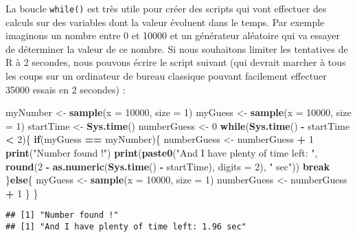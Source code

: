 \documentclass[]{book}
\newenvironment{Shaded}{\begin{snugshade}}{\end{snugshade}}
\newcommand{\KeywordTok}[1]{\textcolor[rgb]{0.13,0.29,0.53}{\textbf{#1}}}
\newcommand{\DataTypeTok}[1]{\textcolor[rgb]{0.13,0.29,0.53}{#1}}
\newcommand{\DecValTok}[1]{\textcolor[rgb]{0.00,0.00,0.81}{#1}}
\newcommand{\StringTok}[1]{\textcolor[rgb]{0.31,0.60,0.02}{#1}}
\newcommand{\ControlFlowTok}[1]{\textcolor[rgb]{0.13,0.29,0.53}{\textbf{#1}}}
\newcommand{\OperatorTok}[1]{\textcolor[rgb]{0.81,0.36,0.00}{\textbf{#1}}}
\newcommand{\NormalTok}[1]{#1}
\theoremstyle{definition}
\theoremstyle{definition}
\theoremstyle{definition}
\theoremstyle{remark}
\begin{document}
La boucle \texttt{while()} est très utile pour créer des scripts qui
vont effectuer des calculs sur des variables dont la valeur évoluent
dans le temps. Par exemple imaginons un nombre entre 0 et 10000 et un
générateur aléatoire qui va essayer de déterminer la valeur de ce
nombre. Si nous souhaitons limiter les tentatives de R à 2 secondes,
nous pouvons écrire le script suivant (qui devrait marcher à tous les
coups sur un ordinateur de bureau classique pouvant facilement effectuer
35000 essais en 2 secondes) :

\begin{Shaded}
\begin{Highlighting}[]
\NormalTok{myNumber <-}\StringTok{ }\KeywordTok{sample}\NormalTok{(}\DataTypeTok{x =} \DecValTok{10000}\NormalTok{, }\DataTypeTok{size =} \DecValTok{1}\NormalTok{)}
\NormalTok{myGuess <-}\StringTok{ }\KeywordTok{sample}\NormalTok{(}\DataTypeTok{x =} \DecValTok{10000}\NormalTok{, }\DataTypeTok{size =} \DecValTok{1}\NormalTok{)}
\NormalTok{startTime <-}\StringTok{ }\KeywordTok{Sys.time}\NormalTok{()}
\NormalTok{numberGuess <-}\StringTok{ }\DecValTok{0}
\ControlFlowTok{while}\NormalTok{(}\KeywordTok{Sys.time}\NormalTok{() }\OperatorTok{-}\StringTok{ }\NormalTok{startTime }\OperatorTok{<}\StringTok{ }\DecValTok{2}\NormalTok{)\{}
  \ControlFlowTok{if}\NormalTok{(myGuess }\OperatorTok{==}\StringTok{ }\NormalTok{myNumber)\{}
\NormalTok{    numberGuess <-}\StringTok{ }\NormalTok{numberGuess }\OperatorTok{+}\StringTok{ }\DecValTok{1}
    \KeywordTok{print}\NormalTok{(}\StringTok{"Number found !"}\NormalTok{)}
    \KeywordTok{print}\NormalTok{(}\KeywordTok{paste0}\NormalTok{(}\StringTok{"And I have plenty of time left: "}\NormalTok{, }
      \KeywordTok{round}\NormalTok{(}\DecValTok{2} \OperatorTok{-}\StringTok{ }\KeywordTok{as.numeric}\NormalTok{(}\KeywordTok{Sys.time}\NormalTok{() }\OperatorTok{-}\StringTok{ }\NormalTok{startTime), }\DataTypeTok{digits =} \DecValTok{2}\NormalTok{), }
      \StringTok{" sec"}\NormalTok{))}
    \ControlFlowTok{break}
\NormalTok{  \}}\ControlFlowTok{else}\NormalTok{\{}
\NormalTok{    myGuess <-}\StringTok{ }\KeywordTok{sample}\NormalTok{(}\DataTypeTok{x =} \DecValTok{10000}\NormalTok{, }\DataTypeTok{size =} \DecValTok{1}\NormalTok{)}
\NormalTok{    numberGuess <-}\StringTok{ }\NormalTok{numberGuess }\OperatorTok{+}\StringTok{ }\DecValTok{1}
\NormalTok{  \}}
\NormalTok{\}}
\end{Highlighting}
\end{Shaded}

\begin{verbatim}
## [1] "Number found !"
## [1] "And I have plenty of time left: 1.96 sec"
\end{verbatim}
\end{document}
